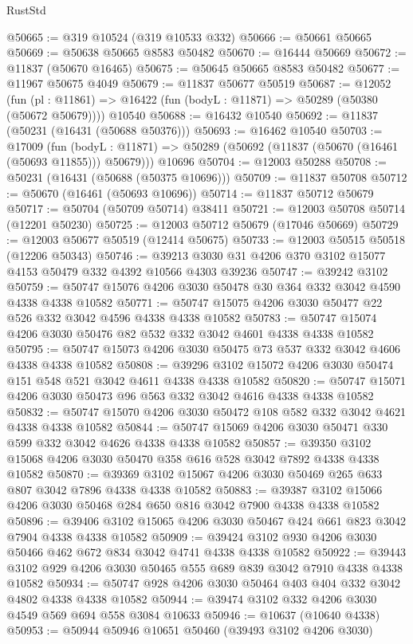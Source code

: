 \begin{lexlean}{RustStd}
\begin{coremodule}
@50665 := @319 @10524 (@319 @10533 @332)
@50666 := @50661 @50665
@50669 := @50638 @50665 @8583 @50482
@50670 := @16444 @50669
@50672 := @11837 (@50670 @16465)
@50675 := @50645 @50665 @8583 @50482
@50677 := @11967 @50675 @4049
@50679 := @11837 @50677 @50519
@50687 := @12052
    (fun (pl : @11861) => @16422 (fun (bodyL : @11871) => @50289 (@50380 (@50672 @50679))))
    @10540
@50688 := @16432 @10540
@50692 := @11837 (@50231 (@16431 (@50688 @50376)))
@50693 := @16462 @10540
@50703 := @17009
    (fun (bodyL : @11871) => @50289 (@50692 (@11837 (@50670 (@16461 (@50693 @11855))) @50679)))
    @10696
@50704 := @12003 @50288
@50708 := @50231 (@16431 (@50688 (@50375 @10696)))
@50709 := @11837 @50708
@50712 := @50670 (@16461 (@50693 @10696))
@50714 := @11837 @50712 @50679
@50717 := @50704 (@50709 @50714) @38411
@50721 := @12003 @50708 @50714 (@12201 @50230)
@50725 := @12003 @50712 @50679 (@17046 @50669)
@50729 := @12003 @50677 @50519 (@12414 @50675)
@50733 := @12003 @50515 @50518 (@12206 @50343)
@50746 := @39213 @3030 @31 @4206 @370 @3102 @15077 @4153 @50479 @332 @4392 @10566 @4303 @39236
@50747 := @39242 @3102
@50759 := @50747 @15076 @4206 @3030 @50478 @30 @364 @332 @3042 @4590 @4338 @4338 @10582
@50771 := @50747 @15075 @4206 @3030 @50477 @22 @526 @332 @3042 @4596 @4338 @4338 @10582
@50783 := @50747 @15074 @4206 @3030 @50476 @82 @532 @332 @3042 @4601 @4338 @4338 @10582
@50795 := @50747 @15073 @4206 @3030 @50475 @73 @537 @332 @3042 @4606 @4338 @4338 @10582
@50808 := @39296 @3102 @15072 @4206 @3030 @50474 @151 @548 @521 @3042 @4611 @4338 @4338 @10582
@50820 := @50747 @15071 @4206 @3030 @50473 @96 @563 @332 @3042 @4616 @4338 @4338 @10582
@50832 := @50747 @15070 @4206 @3030 @50472 @108 @582 @332 @3042 @4621 @4338 @4338 @10582
@50844 := @50747 @15069 @4206 @3030 @50471 @330 @599 @332 @3042 @4626 @4338 @4338 @10582
@50857 := @39350 @3102 @15068 @4206 @3030 @50470 @358 @616 @528 @3042 @7892 @4338 @4338 @10582
@50870 := @39369 @3102 @15067 @4206 @3030 @50469 @265 @633 @807 @3042 @7896 @4338 @4338 @10582
@50883 := @39387 @3102 @15066 @4206 @3030 @50468 @284 @650 @816 @3042 @7900 @4338 @4338 @10582
@50896 := @39406 @3102 @15065 @4206 @3030 @50467 @424 @661 @823 @3042 @7904 @4338 @4338 @10582
@50909 := @39424 @3102 @930 @4206 @3030 @50466 @462 @672 @834 @3042 @4741 @4338 @4338 @10582
@50922 := @39443 @3102 @929 @4206 @3030 @50465 @555 @689 @839 @3042 @7910 @4338 @4338 @10582
@50934 := @50747 @928 @4206 @3030 @50464 @403 @404 @332 @3042 @4802 @4338 @4338 @10582
@50944 := @39474 @3102 @332 @4206 @3030 @4549 @569 @694 @558 @3084 @10633
@50946 := @10637 (@10640 @4338)
@50953 := @50944 @50946 @10651 @50460 (@39493 @3102 @4206 @3030)

\end{coremodule}
\end{lexlean}
